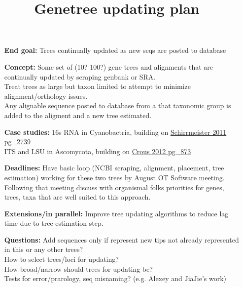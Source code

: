 \documentclass[a4paper,10pt]{article}
\title{Genetree updating plan}
\author{}
\begin{document}
\maketitle

\begin{itemize}
 \item [\textbf{End goal:}]
Trees continually updated as new seqs are posted to database
 \item[\textbf{Concept:}]
Some set of (10? 100?) gene trees and alignments that are continually updated by scraping genbank or SRA.\\
Treat trees as large but taxon limited to attempt to minimize alignment/orthology issues.\\
Any alignable sequence posted to database from a that taxonomic group is added to the aligment and a new tree estimated.
 \item[\textbf{Case studies:}]
16s RNA in Cyanobactria, building on \href{https://tree.opentreeoflife.org/curator/study/view/pg_2739}{Schirrmeister 2011 pg\_2739}\\
ITS and LSU in Ascomycota, building on \href{https://tree.opentreeoflife.org/curator/study/view/pg_873}{Crous 2012 pg\_873}\\
 \item[\textbf{Deadlines:}]
Have basic loop (NCBI scraping, alignment, placement, tree estimation) working for these two trees by August OT Software meeting.\\
Following that meeting discuss with organismal folks priorities for genes, trees, taxa that are well suited to this approach.\\
 \item[\textbf{Extensions/in parallel:}]
Improve tree updating algorithms to reduce lag time due to tree estimation step.\\
 \item[\textbf{Questions:}]
Add sequences only if represent new tips not already represented in this or any other trees?\\
How to select trees/loci for updating?\\
How broad/narrow should trees for updating be?\\
Tests for error/prarology, seq misnaming? (e.g. Alexey and JiaJie's work)\\
\end{itemize}
\end{document}
